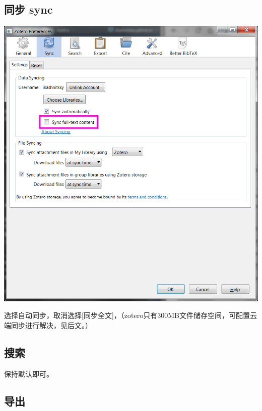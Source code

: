 \documentclass[
  letterpaper,
  DIV=11,
  numbers=noendperiod,
  oneside]{scrreprt}
\begin{document}
\hypertarget{ux540cux6b65-sync}{%
\subsection{同步 sync}\label{ux540cux6b65-sync}}

\includegraphics{./images/zotero_sync.png}

选择自动同步，取消选择{[}同步全文{]}，（zotero只有300MB文件储存空间，可配置云端同步进行解决，见后文。）

\hypertarget{ux641cux7d22}{%
\subsection{搜索}\label{ux641cux7d22}}

保持默认即可。

\hypertarget{ux5bfcux51fa}{%
\subsection{导出}\label{ux5bfcux51fa}}
\end{document}
